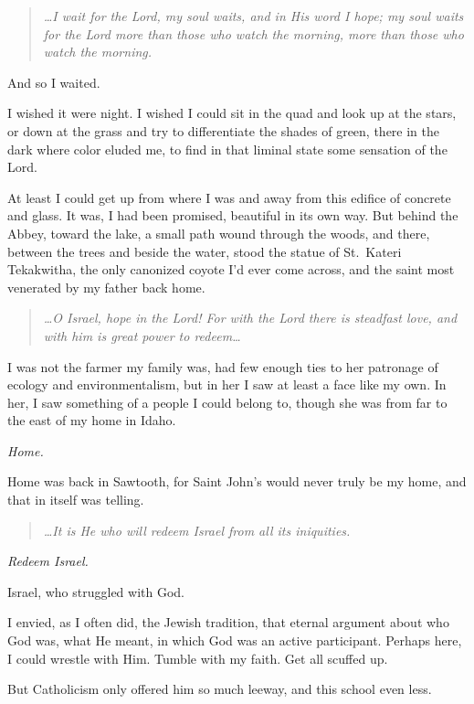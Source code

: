 \begin{quote}
\emph{\ldots I wait for the Lord, my soul waits, and in His word I hope; my soul waits for the Lord more than those who watch the morning, more than those who watch the morning.}
\end{quote}

And so I waited.

I wished it were night. I wished I could sit in the quad and look up at the stars, or down at the grass and try to differentiate the shades of green, there in the dark where color eluded me, to find in that liminal state some sensation of the Lord.

At least I could get up from where I was and away from this edifice of concrete and glass. It was, I had been promised, beautiful in its own way. But behind the Abbey, toward the lake, a small path wound through the woods, and there, between the trees and beside the water, stood the statue of St.~Kateri Tekakwitha, the only canonized coyote I'd ever come across, and the saint most venerated by my father back home.

\begin{quote}
\emph{\ldots O Israel, hope in the Lord! For with the Lord there is steadfast love, and with him is great power to redeem\ldots{}}
\end{quote}

I was not the farmer my family was, had few enough ties to her patronage of ecology and environmentalism, but in her I saw at least a face like my own. In her, I saw something of a people I could belong to, though she was from far to the east of my home in Idaho.

\emph{Home.}

Home was back in Sawtooth, for Saint John's would never truly be my home, and that in itself was telling.

\begin{quote}
\emph{\ldots It is He who will redeem Israel from all its iniquities.}
\end{quote}

\emph{Redeem Israel.}

Israel, who struggled with God.

I envied, as I often did, the Jewish tradition, that eternal argument about who God was, what He meant, in which God was an active participant. Perhaps here, I could wrestle with Him. Tumble with my faith. Get all scuffed up.

But Catholicism only offered him so much leeway, and this school even less.

